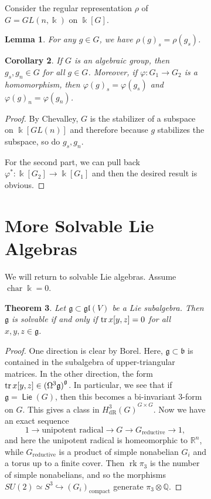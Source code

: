 \documentclass[leqno, openany]{memoir}
\newtheorem{thm}{Theorem}[section]
\newtheorem{cor}[thm]{Corollary}
\newtheorem{lem}[thm]{Lemma}
\theoremstyle{definition}
\theoremstyle{remark}
\theoremstyle{plain}
\theoremstyle{definition}
\theoremstyle{remark}
\newcommand{\R}{\mathbb{R}}
\newcommand{\Q}{\mathbb{Q}}
\renewcommand{\k}{\Bbbk}
\newcommand{\mf}[1]{\mathfrak{#1}}
\newcommand{\mr}[1]{\mathrm{#1}}
\DeclareMathOperator{\Lie}{\mathsf{Lie}}
\DeclareMathOperator{\chr}{char}
\begin{document}
\begin{figure}[H]
\begin{figure}[H]
Consider the regular representation $\rho$ of $G = GL(n, \k)$ on $\k[G]$.

\begin{lem} For any $g \in G$, we have ${\rho(g)}_s = \rho(g_s)$.  \end{lem}

\begin{cor} If $G$ is an algebraic group, then $g_s, g_n \in G$ for all $g \in
G$. Moreover, if $\varphi \colon G_1 \to G_2$ is a homomorphism, then ${
\varphi(g) }_s = \varphi(g_s)$ and ${\varphi(g)}_n = \varphi(g_n)$.  \end{cor}

\begin{proof} By Chevalley, $G$ is the stabilizer of a subspace on $\k[GL(n)]$
    and therefore because $g$ stabilizes the subspace, so do $g_s, g_n$.

    For the second part, we can pull back $\varphi^* \colon \k[G_2] \to
\k[G_1]$ and then the desired result is obvious.  \end{proof}

\section{More Solvable Lie Algebras}%

We will return to solvable Lie algebras. Assume $\chr \k = 0$.

\begin{thm} Let $\mf{g} \subset \mf{gl}(V)$ be a Lie subalgebra. Then $\mf{g}$
is solvable if and only if $\trace x[y,z] = 0$ for all $x,y,z \in \mf{g}$.
\end{thm}

\begin{proof} One direction is clear by Borel. Here, $\mf{g} \subset \mf{b}$ is
    contained in the subalgebra of upper-triangular matrices. In the other
    direction, the form $\trace x[y,z] \in { ( \Omega^3 \mf{g} ) }^{\mf{g}}$.
    In particular, we see that if $\mf{g} = \Lie(G)$, then this becomes a
    bi-invariant $3$-form on $G$. This gives a class in ${H^3_{\mr{dR}}(G)}^{G
    \times G}$. Now we have an exact sequence \[ 1 \to \text{unipotent radical}
    \to G \to G_{\text{reductive}} \to 1, \] and here the unipotent radical is
    homeomorphic to $\R^n$, while $G_{\text{reductive}}$ is a product of simple
    nonabelian $G_i$ and a torus up to a finite cover. Then $\operatorname{rk}
    \pi_3$ is the number of simple nonabelians, and so the morphisms $SU(2)
    \simeq S^3 \hookrightarrow {(G_i)}_{\text{compact}}$ generate $\pi_3
    \otimes \Q$.


\end{proof}
\end{figure}
\end{figure}
\end{document}
